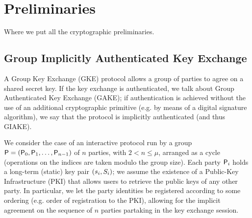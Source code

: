 \section{Preliminaries}\label{sec:preliminaries}
Where we put all the cryptographic preliminaries.

\subsection{Group Implicitly Authenticated Key Exchange}
A Group Key Exchange (GKE) protocol allows a group of parties to agree on a shared secret key. 
If the key exchange is authenticated, we talk about Group Authenticated Key Exchange (GAKE); if authentication is achieved without the use of an additional cryptographic primitive (e.g. by means of a digital signature algorithm), we say that the protocol is implicitly authenticated (and thus GIAKE).

We consider the case of an interactive protocol run by a group $\PartySet = (\Party_0,\allowbreak \Party_1,\dots,\Party_{n-1})$ of $n$ parties, with $2 < n \leq \mu$, arranged as a cycle (operations on the indices are taken modulo the group size).
Each party $\User[i]$ holds a long-term (static) key pair $(\ssk_i,\spk_i)$; we assume the existence of a Public-Key Infrastructure (PKI) that allows users to retrieve the public keys of any other party.
In particular, we let the party identities be registered according to some ordering (e.g. order of registration to the PKI), allowing for the implicit agreement on the sequence of $n$ parties partaking in the key exchange session.

